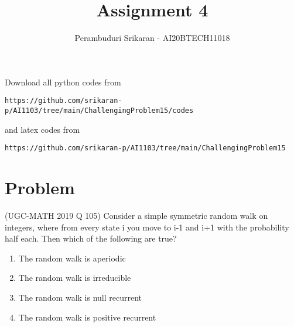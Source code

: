 \documentclass[journal,12pt,twocolumn]{IEEEtran}
\begin{document}
\let\StandardTheFigure\thefigure
\let\vec\mathbf
\renewcommand{\thefigure}{\theproblem}
\def\putbox#1#2#3{\makebox[0in][l]{\makebox[#1][l]{}\raisebox{\baselineskip}[0in][0in]{\raisebox{#2}[0in][0in]{#3}}}}
     \def\rightbox#1{\makebox[0in][r]{#1}}
     \def\centbox#1{\makebox[0in]{#1}}
     \def\topbox#1{\raisebox{-\baselineskip}[0in][0in]{#1}}
     \def\midbox#1{\raisebox{-0.5\baselineskip}[0in][0in]{#1}}
\vspace{3cm}
\title{Assignment 4}
\author{Perambuduri Srikaran - AI20BTECH11018}
\maketitle
\newpage
\bigskip
\renewcommand{\thefigure}{\theenumi}
\renewcommand{\thetable}{\theenumi}
Download all python codes from
\begin{lstlisting}
https://github.com/srikaran-p/AI1103/tree/main/ChallengingProblem15/codes
\end{lstlisting}
and latex codes from 
\begin{lstlisting}
https://github.com/srikaran-p/AI1103/tree/main/ChallengingProblem15
\end{lstlisting}
\section*{Problem}
(UGC-MATH 2019 Q 105) Consider a simple symmetric random walk on integers, where from every state i you move to i-1 and i+1 with the probability half each. Then which of the following are true?
\begin{enumerate}
\item The random walk is aperiodic
\item The random walk is irreducible
\item The random walk is null recurrent 
\item The random walk is positive recurrent
\end{enumerate}
\end{document}
